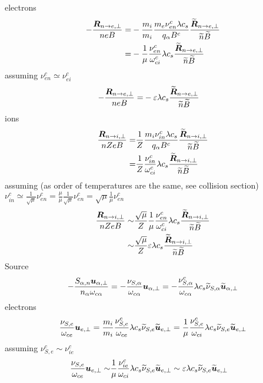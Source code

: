 %
electrons
%
\begin{align*}
    -\frac{ \boldsymbol{R}_{n \to e,\perp} }{n e B}
=&
-
\frac{m_i}{m_i}
\frac{ m_e \nu^c_{e n}\lambda c_s}{ q_\alpha B^c}
\frac{\widetilde{ \boldsymbol{R}}_{n \to e,\perp} }{\widetilde{ n} \widetilde{ B}}
\\
=&
-
\frac{1}{\mu}
\frac{\nu^c_{e n}}{\omega^c_{ci}}
\lambda c_s
\frac{\widetilde{ \boldsymbol{R}}_{n \to e,\perp} }{\widetilde{ n} \widetilde{ B}}
\end{align*}
%
assuming $\nu^c_{e n}\simeq\nu^c_{e i}$
%
\begin{align*}
    -\frac{ \boldsymbol{R}_{n \to e,\perp} }{n e B}
=&
-
\varepsilon
\lambda c_s
\frac{\widetilde{ \boldsymbol{R}}_{n \to e,\perp} }{\widetilde{ n} \widetilde{ B}}
\end{align*}
%
ions
%
\begin{align*}
    \frac{ \boldsymbol{R}_{n \to i,\perp} }{n Ze B}
=&
\frac{1}{Z}
\frac{ m_i \nu^c_{i n}\lambda c_s}{ q_\alpha B^c}
\frac{\widetilde{ \boldsymbol{R}}_{n \to i,\perp} }{\widetilde{ n} \widetilde{ B}}
\\
=&
\frac{1}{Z}
\frac{\nu^c_{i n}}{\omega^c_{ci}}
\lambda c_s
\frac{\widetilde{ \boldsymbol{R}}_{n \to i,\perp} }{\widetilde{ n} \widetilde{ B}}
\end{align*}
%
assuming (as order of temperatures are the same, see collision section) $\nu^c_{i n}\simeq\frac{1}{\sqrt{\mu}}\nu^c_{e n}=\frac{\mu}{\mu}\frac{1}{\sqrt{\mu}}\nu^c_{e n}=\sqrt{\mu}\frac{1}{\mu}\nu^c_{e n}$
%
\begin{align*}
    \frac{ \boldsymbol{R}_{n \to i,\perp} }{n Ze B}
    \sim&
    \frac{\sqrt{\mu}}{Z}
\frac{1}{\mu}
\frac{\nu^c_{e n}}{\omega^c_{ci}}
\lambda c_s
\frac{\widetilde{ \boldsymbol{R}}_{n \to i,\perp} }{\widetilde{ n} \widetilde{ B}}
\\
\sim&
\frac{\sqrt{\mu}}{Z}
\varepsilon
\lambda c_s
\frac{\widetilde{ \boldsymbol{R}}_{n \to i,\perp} }{\widetilde{ n} \widetilde{ B}}
\end{align*}
%
Source
%
\begin{align*}
- \frac{ S_{\alpha,n}\boldsymbol{u}_{\alpha,\perp} }{n_\alpha \omega_{c\alpha}}
=
- \frac{ \nu_{S,\alpha} }{\omega_{c\alpha}}\boldsymbol{u}_{\alpha,\perp}
=
- \frac{ \nu^c_{S,\alpha}}{\omega_{c\alpha}}\lambda c_s \widetilde{ \nu}_{S,\alpha}\widetilde{ \boldsymbol{u}}_{\alpha,\perp}
\end{align*}
%
electrons
%
\begin{align*}
    \frac{ \nu_{S,e} }{\omega_{ce}}\boldsymbol{u}_{e,\perp}
=
\frac{m_i}{m_i} \frac{ \nu^c_{S,e}}{\omega_{ce}}\lambda c_s \widetilde{ \nu}_{S,e}\widetilde{ \boldsymbol{u}}_{e,\perp}
=
\frac{1}{\mu} \frac{ \nu^c_{S,e}}{\omega_{ci}}\lambda c_s \widetilde{ \nu}_{S,e}\widetilde{ \boldsymbol{u}}_{e,\perp}
\end{align*}
%
assuming $ \nu^c_{S,e}\sim\nu^c_{ie}$
%
\begin{align*}
    \frac{ \nu_{S,e} }{\omega_{ce}}\boldsymbol{u}_{e,\perp}
    \sim&
    \frac{1}{\mu} \frac{ \nu^c_{ie}}{\omega_{ci}}\lambda c_s \widetilde{ \nu}_{S,e}\widetilde{ \boldsymbol{u}}_{e,\perp}
    \sim
    \varepsilon \lambda c_s \widetilde{ \nu}_{S,e}\widetilde{ \boldsymbol{u}}_{e,\perp}
\end{align*}
